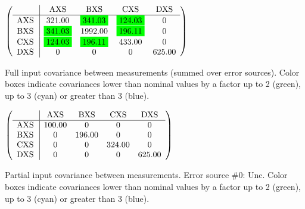 \begin{table}[H]
\scriptsize
\begin{center}
\renewcommand{\arraystretch}{1.1}
\begin{math}\left(\begin{array}{c|cccc}
 & \mathrm{AXS} & 
\mathrm{BXS} & 
\mathrm{CXS} & 
\mathrm{DXS} \\
\hline
\mathrm{AXS} \hspace*{2pt} &     321.00 &  \colorbox{Green1}{$    341.03$} &  \colorbox{Green1}{$    124.03$} &  0 \\
\mathrm{BXS} \hspace*{2pt} &  \colorbox{Green1}{$    341.03$} &    1992.00 &  \colorbox{Green1}{$    196.11$} &  0 \\
\mathrm{CXS} \hspace*{2pt} &  \colorbox{Green1}{$    124.03$} &  \colorbox{Green1}{$    196.11$} &     433.00 &  0 \\
\mathrm{DXS} \hspace*{2pt} &  0 &  0 &  0 &     625.00 \\
\end{array}\right)\end{math}
\caption{Full input covariance between measurements (summed over error sources). Color boxes indicate covariances lower than nominal values by a factor up to 2 (green), up to 3 (cyan) or greater than 3 (blue).}
\renewcommand{\arraystretch}{1}
\end{center}
\end{table}
\begin{table}[H]
\scriptsize
\begin{center}
\renewcommand{\arraystretch}{1.1}
\begin{math}\left(\begin{array}{c|cccc}
 & \mathrm{AXS} & 
\mathrm{BXS} & 
\mathrm{CXS} & 
\mathrm{DXS} \\
\hline
\mathrm{AXS} \hspace*{2pt} &     100.00 &  0 &  0 &  0 \\
\mathrm{BXS} \hspace*{2pt} &  0 &     196.00 &  0 &  0 \\
\mathrm{CXS} \hspace*{2pt} &  0 &  0 &     324.00 &  0 \\
\mathrm{DXS} \hspace*{2pt} &  0 &  0 &  0 &     625.00 \\
\end{array}\right)\end{math}
\caption{Partial input covariance between measurements. Error source \#0: Unc. Color boxes indicate covariances lower than nominal values by a factor up to 2 (green), up to 3 (cyan) or greater than 3 (blue).}
\renewcommand{\arraystretch}{1}
\end{center}
\end{table}
